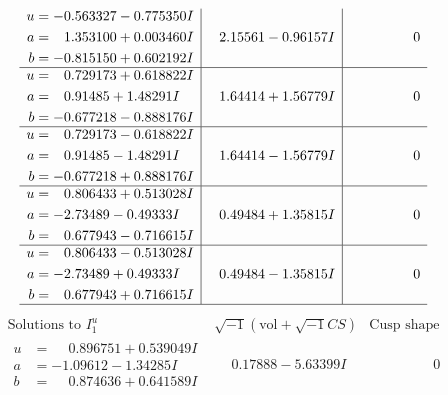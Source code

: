 \documentclass[1p]{elsarticle_modified}
\theoremstyle{definition}
\newcommand{\I}{\sqrt{-1}}
\begin{document}
$$\begin{array}{c|c|c}
\begin{aligned}
u &= -0.563327 - 0.775350 I \\
a &= \phantom{-}1.353100 + 0.003460 I \\
b &= -0.815150 + 0.602192 I\end{aligned}
 & \phantom{-}2.15561 - 0.96157 I & \phantom{-0.000000 } 0 \\ \hline\begin{aligned}
u &= \phantom{-}0.729173 + 0.618822 I \\
a &= \phantom{-}0.91485 + 1.48291 I \\
b &= -0.677218 - 0.888176 I\end{aligned}
 & \phantom{-}1.64414 + 1.56779 I & \phantom{-0.000000 } 0 \\ \hline\begin{aligned}
u &= \phantom{-}0.729173 - 0.618822 I \\
a &= \phantom{-}0.91485 - 1.48291 I \\
b &= -0.677218 + 0.888176 I\end{aligned}
 & \phantom{-}1.64414 - 1.56779 I & \phantom{-0.000000 } 0 \\ \hline\begin{aligned}
u &= \phantom{-}0.806433 + 0.513028 I \\
a &= -2.73489 - 0.49333 I \\
b &= \phantom{-}0.677943 - 0.716615 I\end{aligned}
 & \phantom{-}0.49484 + 1.35815 I & \phantom{-0.000000 } 0 \\ \hline\begin{aligned}
u &= \phantom{-}0.806433 - 0.513028 I \\
a &= -2.73489 + 0.49333 I \\
b &= \phantom{-}0.677943 + 0.716615 I\end{aligned}
 & \phantom{-}0.49484 - 1.35815 I & \phantom{-0.000000 } 0\\
 \hline 
 \end{array}$$\newpage$$\begin{array}{c|c|c}  
\text{Solutions to }I^u_{1}& \I (\text{vol} + \sqrt{-1}CS) & \text{Cusp shape}\\
 \hline 
\begin{aligned}
u &= \phantom{-}0.896751 + 0.539049 I \\
a &= -1.09612 - 1.34285 I \\
b &= \phantom{-}0.874636 + 0.641589 I\end{aligned}
 & \phantom{-}0.17888 - 5.63399 I & \phantom{-0.000000 } 0 \\ \hline\begin{aligned}

\end{aligned}
\end{array}$$
\end{document}
